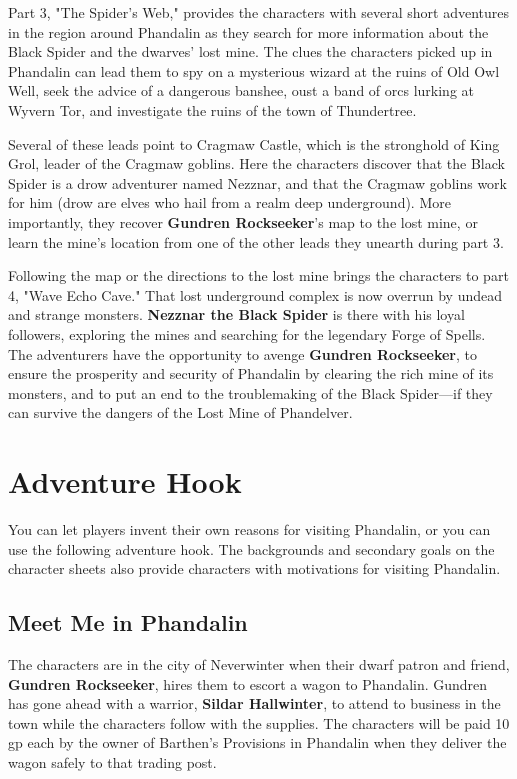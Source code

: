 \documentclass[10pt,a4paper,twoside,bg=print,twocolumn,openany,nodeprecatedcode]{dndbook}
\begin{document}
Part 3, "The Spider's Web," provides the characters with several short adventures in the region around Phandalin as they search for more information about the Black Spider and the dwarves' lost mine. The clues the characters picked up in Phandalin can lead them to spy on a mysterious wizard at the ruins of Old Owl Well, seek the advice of a dangerous banshee, oust a band of orcs lurking at Wyvern Tor, and investigate the ruins of the town of Thundertree.

Several of these leads point to Cragmaw Castle, which is the stronghold of King Grol, leader of the Cragmaw goblins. Here the characters discover that the Black Spider is a drow adventurer named Nezznar, and that the Cragmaw goblins work for him (drow are elves who hail from a realm deep underground). More importantly, they recover \textbf{Gundren Rockseeker}'s map to the lost mine, or learn the mine's location from one of the other leads they unearth during part 3.

Following the map or the directions to the lost mine brings the characters to part 4, "Wave Echo Cave." That lost underground complex is now overrun by undead and strange monsters. \textbf{Nezznar the Black Spider} is there with his loyal followers, exploring the mines and searching for the legendary Forge of Spells. The adventurers have the opportunity to avenge \textbf{Gundren Rockseeker}, to ensure the prosperity and security of Phandalin by clearing the rich mine of its monsters, and to put an end to the troublemaking of the Black Spider—if they can survive the dangers of the Lost Mine of Phandelver.

\section{Adventure Hook}
You can let players invent their own reasons for visiting Phandalin, or you can use the following adventure hook. The backgrounds and secondary goals on the character sheets also provide characters with motivations for visiting Phandalin.

\subsection{Meet Me in Phandalin}
The characters are in the city of Neverwinter when their dwarf patron and friend, \textbf{Gundren Rockseeker}, hires them to escort a wagon to Phandalin. Gundren has gone ahead with a warrior, \textbf{Sildar Hallwinter}, to attend to business in the town while the characters follow with the supplies. The characters will be paid 10 gp each by the owner of Barthen's Provisions in Phandalin when they deliver the wagon safely to that trading post.
\end{document}
